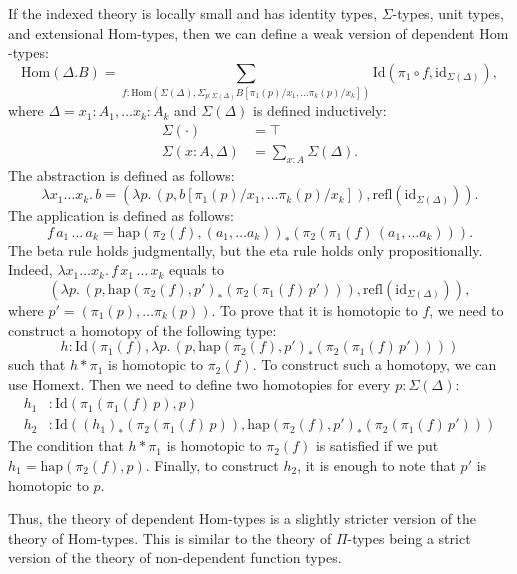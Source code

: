 \documentclass[reqno]{mscs}
\newcommand{\fs}[1]{\mathrm{#1}}
\newcommand{\Hom}{\fs{Hom}}
\newcommand{\Id}{\fs{Id}}
\newcommand{\refl}{\fs{refl}}
\newcommand{\id}{\fs{id}}
\newcommand{\Idext}{\fs{Homext}}
\numberwithin{figure}{section}
\begin{document}
If the indexed theory is locally small and has identity types, $\Sigma$-types, unit types, and extensional $\Hom$-types, then we can define a weak version of dependent $\Hom$-types:
\[ \Hom(\Delta.B) = \sum_{f : \Hom(\Sigma(\Delta),\Sigma_{p : \Sigma(\Delta)} B[\pi_1(p)/x_1, \ldots \pi_k(p)/x_k])} \Id(\pi_1 \circ f, \id_{\Sigma(\Delta)}), \]
where $\Delta = x_1 : A_1, \ldots x_k : A_k$ and $\Sigma(\Delta)$ is defined inductively:
\begin{align*}
\Sigma(\cdot) & = \top \\
\Sigma(x : A, \Delta) & = \sum_{x : A} \Sigma(\Delta).
\end{align*}
The abstraction is defined as follows:
\[ \lambda x_1 \ldots x_k.\,b = (\lambda p.\,(p, b[\pi_1(p)/x_1, \ldots \pi_k(p)/x_k]), \refl(\id_{\Sigma(\Delta)})). \]
The application is defined as follows:
\[ f\,a_1\,\ldots\,a_k = \fs{hap}(\pi_2(f),(a_1, \ldots a_k))_*(\pi_2(\pi_1(f)\,(a_1, \ldots a_k))). \]
The beta rule holds judgmentally, but the eta rule holds only propositionally.
Indeed, $\lambda x_1 \ldots x_k.\,f\,x_1\,\ldots\,x_k$ equals to
\[ (\lambda p.\,(p,\fs{hap}(\pi_2(f),p')_*(\pi_2(\pi_1(f)\,p'))), \refl(\id_{\Sigma(\Delta)})), \]
where $p' = (\pi_1(p), \ldots \pi_k(p))$.
To prove that it is homotopic to $f$, we need to construct a homotopy of the following type:
\[ h : \Id(\pi_1(f), \lambda p.\,(p,\fs{hap}(\pi_2(f),p')_*(\pi_2(\pi_1(f)\,p')))) \]
such that $h * \pi_1$ is homotopic to $\pi_2(f)$.
To construct such a homotopy, we can use $\Idext$.
Then we need to define two homotopies for every $p : \Sigma(\Delta)$:
\begin{align*}
h_1 & : \Id(\pi_1(\pi_1(f)\,p),p) \\
h_2 & : \Id((h_1)_*(\pi_2(\pi_1(f)\,p)),\fs{hap}(\pi_2(f),p')_*(\pi_2(\pi_1(f)\,p')))
\end{align*}
The condition that $h * \pi_1$ is homotopic to $\pi_2(f)$ is satisfied if we put $h_1 = \fs{hap}(\pi_2(f),p)$.
Finally, to construct $h_2$, it is enough to note that $p'$ is homotopic to $p$.

Thus, the theory of dependent $\Hom$-types is a slightly stricter version of the theory of $\Hom$-types.
This is similar to the theory of $\Pi$-types being a strict version of the theory of non-dependent function types.
\end{document}
